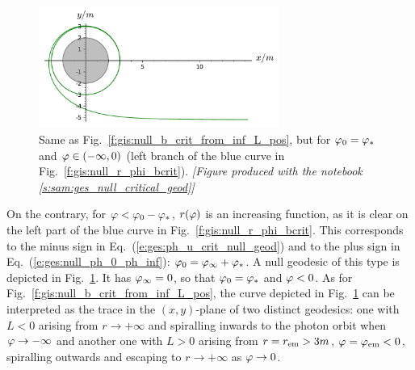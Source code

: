 \begin{figure}
\centerline{\includegraphics[width=0.7\textwidth]{ges_null_b_crit_from_inf_L_neg.pdf}}
\caption[]{\label{f:gis:null_b_crit_from_inf_L_neg} \footnotesize
Same as Fig.~\ref{f:gis:null_b_crit_from_inf_L_pos}, but for $\varphi_0 = \varphi_*$
and $\varphi\in(-\infty,0)$ (left branch of the blue curve in Fig.~\ref{f:gis:null_r_phi_bcrit}).
\textsl{[Figure produced with the notebook \ref{s:sam:ges_null_critical_geod}]}
}
\end{figure}

On the contrary, for $\varphi < \varphi_0 - \varphi_*$,
$r(\varphi)$ is an increasing
function, as it is clear on the left part of the blue curve in Fig.~\ref{f:gis:null_r_phi_bcrit}.
This corresponds to the
minus sign in Eq.~(\ref{e:ges:ph_u_crit_null_geod}) and to the plus sign in
Eq.~(\ref{e:ges:null_ph_0_ph_inf}): $\varphi_0 = \varphi_\infty + \varphi_*$.
A null geodesic of this type is depicted in Fig.~\ref{f:gis:null_b_crit_from_inf_L_neg}.
It has $\varphi_\infty = 0$, so that $\varphi_0 = \varphi_*$ and $\varphi < 0$.
As for Fig.~\ref{f:gis:null_b_crit_from_inf_L_pos}, the curve depicted in
Fig.~\ref{f:gis:null_b_crit_from_inf_L_neg} can be interpreted as the trace
in the $(x,y)$-plane of two distinct
geodesics: one with $L<0$ arising from $r\to + \infty$
and spiralling inwards to the photon orbit when $\varphi\to -\infty$
and another one with $L>0$
arising from $r=r_{\rm em} > 3 m$, $\varphi=\varphi_{\rm em}<0$,
spiralling outwards and escaping to $r\to +\infty$ as $\varphi\to 0$.

